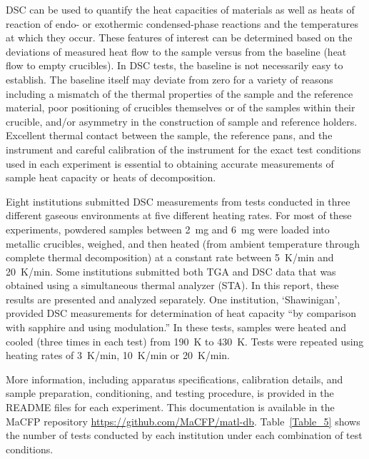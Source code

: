 \documentclass{book}
\begin{document}
DSC can be used to quantify the heat capacities of materials as well as heats of reaction of endo- or exothermic condensed-phase reactions and the temperatures at which they occur. These features of interest can be determined based on the deviations of measured heat flow to the sample versus from the baseline (heat flow to empty crucibles). In DSC tests, the baseline is not necessarily easy to establish. The baseline itself may deviate from zero for a variety of reasons including a mismatch of the thermal properties of the sample and the reference material, poor positioning of crucibles themselves or of the samples within their crucible, and/or asymmetry in the construction of sample and reference holders. Excellent thermal contact between the sample, the reference pans, and the instrument and careful calibration of the instrument for the exact test conditions used in each experiment is essential to obtaining accurate measurements of sample heat capacity or heats of decomposition.

Eight institutions submitted DSC measurements from tests conducted in three different gaseous environments at five different heating rates. For most of these experiments, powdered samples between 2~mg and 6~mg were loaded into metallic crucibles, weighed, and then heated (from ambient temperature through complete thermal decomposition) at a constant rate between 5~K/min and 20~K/min. Some institutions submitted both TGA and DSC data that was obtained using a simultaneous thermal analyzer (STA). In this report, these results are presented and analyzed separately. One institution, ‘Shawinigan’, provided DSC measurements for determination of heat capacity ``by comparison with sapphire and using modulation.'' In these tests, samples were heated and cooled (three times in each test) from 190~K to 430~K. Tests were repeated using heating rates of 3~K/min, 10~K/min or 20~K/min.

More information, including  apparatus specifications, calibration details, and sample preparation, conditioning, and testing procedure, is provided in the README files for each experiment. This documentation is available in the MaCFP repository \href{https://github.com/MaCFP/matl-db}{https://github.com/MaCFP/matl-db}. Table~\ref{Table_5} shows the number of tests conducted by each institution under each combination of test conditions.
\end{document}
